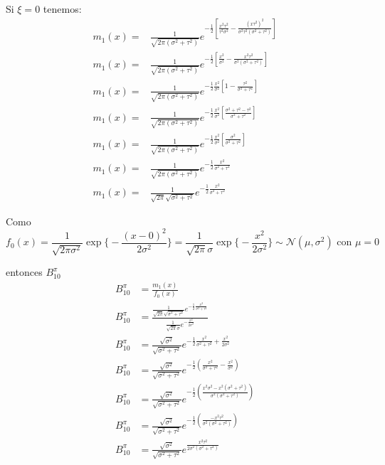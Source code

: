 \documentclass[12pt,]{article}
\begin{document}
Si \(\xi=0\) tenemos: \[
\begin{array}{rl}
m_1(x)=& \frac{1}{\sqrt{2\pi(\sigma^2+\tau^2)}} e^{-\frac{1}{2}\left[\frac{x^2\tau^2}{\tau^2\sigma^2}-
\frac{(x\tau^2)^2}{\sigma^2\tau^2(\sigma^2+\tau^2)}\right]}\\
m_1(x)=& \frac{1}{\sqrt{2\pi(\sigma^2+\tau^2)}} e^{-\frac{1}{2}\left[\frac{x^2}{\sigma^2}-
\frac{x^2\tau^2}{\sigma^2(\sigma^2+\tau^2)}\right]}\\
m_1(x)=& \frac{1}{\sqrt{2\pi(\sigma^2+\tau^2)}} e^{-\frac{1}{2}\frac{x^2}{\sigma^2}\left[1-
\frac{\tau^2}{\sigma^2+\tau^2}\right]}\\
m_1(x)=& \frac{1}{\sqrt{2\pi(\sigma^2+\tau^2)}} e^{-\frac{1}{2}\frac{x^2}{\sigma^2}\left[\frac{\sigma^2+\tau^2-\tau^2}{\sigma^2+\tau^2}\right]}\\
m_1(x)=& \frac{1}{\sqrt{2\pi(\sigma^2+\tau^2)}} e^{-\frac{1}{2}\frac{x^2}{\sigma^2}\left[\frac{\sigma^2}{\sigma^2+\tau^2}\right]}\\
m_1(x)=& \frac{1}{\sqrt{2\pi(\sigma^2+\tau^2)}} e^{-\frac{1}{2}\frac{x^2}{\sigma^2+\tau^2}}\\
m_1(x)=&\frac{1}{\sqrt{2\pi}\sqrt{\sigma^2+\tau^2}}e^{ -\frac{1}{2}\frac{x^2}{\sigma^2+\tau^2}}
\end{array}
\]

Como \[
f_0(x)=\frac{1}{\sqrt{2\pi\sigma^2}}\exp\bigg\{-\frac{(x-0)^2}{2\sigma^2} \bigg\}=\frac{1}{\sqrt{2\pi}\sigma}\exp\bigg\{-\frac{x^2}{2\sigma^2} \bigg\}\sim\mathcal{N(\mu,\sigma^2)}\text{ con }\mu=0
\]

entonces \(B_{10}^\pi\) \[
\begin{array}{rl}
B_{10}^\pi & =\frac{m_1(x)}{f_0(x)}\\
B_{10}^\pi & =\frac{ \frac{1}{\sqrt{2\pi}\sqrt{\sigma^2+\tau^2}}e^{ -\frac{1}{2}\frac{x^2}{\sigma^2+\tau^2}}}{\frac{1}{\sqrt{2\pi}\sigma}e^{-\frac{x^2}{2\sigma^2}}}\\
B_{10}^\pi & =\frac{\sqrt{\sigma^2}}{\sqrt{\sigma^2+\tau^2}} e^{ -\frac{1}{2}\frac{x^2}{\sigma^2+\tau^2}+\frac{x^2}{2\sigma^2}}\\
B_{10}^\pi & =\frac{\sqrt{\sigma^2}}{\sqrt{\sigma^2+\tau^2}} e^{ -\frac{1}{2}\left( \frac{x^2}{\sigma^2+\tau^2}-\frac{x^2}{\sigma^2}\right)}\\
B_{10}^\pi & =\frac{\sqrt{\sigma^2}}{\sqrt{\sigma^2+\tau^2}} e^{ -\frac{1}{2}\left( \frac{x^2\sigma^2 -x^2(\sigma^2+\tau^2)}{\sigma^2(\sigma^2+\tau^2)}\right)}\\
B_{10}^\pi & =\frac{\sqrt{\sigma^2}}{\sqrt{\sigma^2+\tau^2}} e^{-\frac{1}{2}\left( \frac{-x^2\tau^2}{\sigma^2(\sigma^2+\tau^2)}\right)}\\
B_{10}^\pi & =\frac{\sqrt{\sigma^2}}{\sqrt{\sigma^2+\tau^2}} e^{ \frac{x^2\tau^2}{2\sigma^2(\sigma^2+\tau^2)}}
\end{array}
\]
\end{document}

